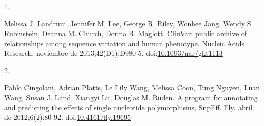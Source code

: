 \documentclass[
  spanish,
  11pt,
]{article}
\newlength{\cslhangindent}
\newlength{\csllabelwidth}
\newenvironment{CSLReferences}[2] %
 {\begin{list}{}{%
  \setlength{\itemindent}{0pt}
  \setlength{\leftmargin}{0pt}
  \setlength{\parsep}{0pt}
  \ifodd #1
   \setlength{\leftmargin}{\cslhangindent}
   \setlength{\itemindent}{-1\cslhangindent}
  \fi
  \setlength{\itemsep}{#2\baselineskip}}}
 {\end{list}}
\newcommand{\CSLLeftMargin}[1]{\parbox[t]{\csllabelwidth}{\strut#1\strut}}
\newcommand{\CSLRightInline}[1]{\parbox[t]{\linewidth - \csllabelwidth}{\strut#1\strut}}
\begin{document}
\label{refs}
\begin{CSLReferences}{0}{1}
\CSLLeftMargin{1. }%
\CSLRightInline{Melissa J. Landrum, Jennifer M. Lee, George R. Riley,
Wonhee Jang, Wendy S. Rubinstein, Deanna M. Church, Donna R. Maglott.
{ClinVar: public archive of relationships among sequence variation and
human phenotype}. Nucleic Acids Research. noviembre de
2013;42(D1):D980-5.
doi:\href{https://doi.org/10.1093/nar/gkt1113}{10.1093/nar/gkt1113}}

\CSLLeftMargin{2. }%
\CSLRightInline{Pablo Cingolani, Adrian Platts, Le Lily Wang, Melissa
Coon, Tung Nguyen, Luan Wang, Susan J. Land, Xiangyi Lu, Douglas M.
Ruden. {A program for annotating and predicting the effects of single
nucleotide polymorphisms, SnpEff}. Fly. abril de 2012;6(2):80-92.
doi:\href{https://doi.org/10.4161/fly.19695}{10.4161/fly.19695}}

\end{CSLReferences}
\end{document}
